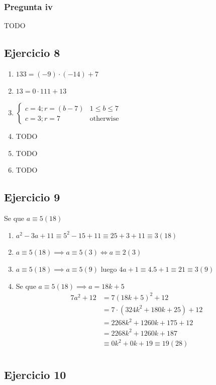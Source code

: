 \subsubsection{Pregunta iv}
TODO

\subsection{Ejercicio 8}
\begin{enumerate}
    \item $ 133 = (-9) \cdot (-14) + 7 $ 
    \item $ 13 = 0 \cdot 111 + 13 $ 
    \item $\begin{cases}
        c = 4; r = (b-7) & 1\leq b \leq 7 \\
        c = 3; r = 7 & \text{otherwise} 
    \end{cases}$
    \item TODO
    \item TODO
    \item TODO
\end{enumerate}

\subsection{Ejercicio 9}
Se que $ a \equiv 5 (18) $

\begin{enumerate}
    \item $ a^2 - 3a + 11 \equiv 5^2 - 15 + 11 \equiv 25 + 3 + 11 \equiv 3(18) $
    \item $ a\equiv 5(18) \implies a \equiv 5(3) \iff a\equiv 2(3) $
    \item $ a\equiv 5(18) \implies a \equiv 5(9) $ luego $ 4a+1 \equiv 4.5 + 1 \equiv 21 \equiv 3(9) $
    \item Se que $ a \equiv 5(18) \implies a = 18k + 5$
    \begin{align*}
        7a^2 + 12 &= 7(18k + 5)^2 + 12 \\
        &= 7\cdot (324k^2 + 180k+ 25) + 12 \\
        &= 2268k^2 + 1260k+ 175 + 12 \\
        &= 2268k^2 + 1260k+ 187 \\
        &\equiv 0k^2 + 0k+ 19 \equiv 19(28) \\
    \end{align*}
\end{enumerate}

\subsection{Ejercicio 10}
